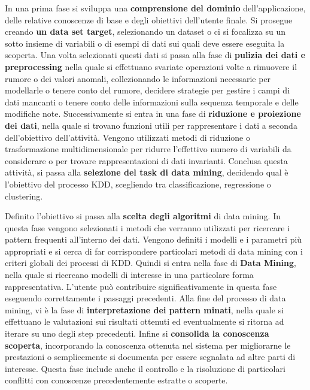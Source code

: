 \documentclass[a4paper]{extarticle}
\begin{document}
In una prima fase si sviluppa una \textbf{comprensione del dominio} dell'applicazione, delle relative conoscenze di base e degli obiettivi dell'utente finale. Si prosegue creando \textbf{un data set target}, selezionando un dataset o ci si focalizza su un sotto insieme di variabili o di esempi di dati sui quali deve essere eseguita la scoperta. Una volta selezionati questi dati si passa alla fase di \textbf{pulizia dei dati e preprocessing} nella quale si effettuano svariate operazioni volte a rimuovere il rumore o dei valori anomali, collezionando le informazioni necessarie per modellarle o tenere conto del rumore, decidere strategie per gestire i campi di dati mancanti o tenere conto delle informazioni sulla sequenza temporale e delle modifiche note. Successivamente si entra in una fase di \textbf{riduzione e proiezione dei dati}, nella quale si trovano funzioni utili per rappresentare i dati a seconda dell'obiettivo dell'attività. Vengono utilizzati metodi di riduzione o trasformazione multidimensionale per ridurre l'effettivo numero di variabili da considerare o per trovare rappresentazioni di dati invarianti. Conclusa questa attività, si passa alla \textbf{selezione del task di data mining}, decidendo qual è l'obiettivo del processo KDD, scegliendo tra classificazione, regressione o clustering. 

Definito l'obiettivo si passa alla \textbf{scelta degli algoritmi} di data mining. In questa fase vengono selezionati i metodi che verranno utilizzati per ricercare i pattern frequenti all'interno dei dati. Vengono definiti i modelli e i parametri più appropriati e si cerca di far corrispondere particolari metodi di data mining con i criteri globali dei processi di KDD. Quindi si entra nella fase di \textbf{Data Mining}, nella quale si ricercano modelli di interesse in una particolare forma rappresentativa.  L'utente può contribuire significativamente in questa fase eseguendo correttamente i passaggi precedenti. Alla fine del processo di data mining, vi è la fase di \textbf{interpretazione dei pattern minati}, nella quale si effettuano le valutazioni sui risultati ottenuti ed eventualmente si ritorna ad iterare su uno degli step precedenti. Infine si \textbf{consolida la conoscenza scoperta}, incorporando la conoscenza ottenuta nel sistema per migliorarne le prestazioni o semplicemente si documenta per essere segnalata ad altre parti di interesse. Questa fase include anche il controllo e la risoluzione di particolari conflitti con conoscenze precedentemente estratte o scoperte.
\end{document}
